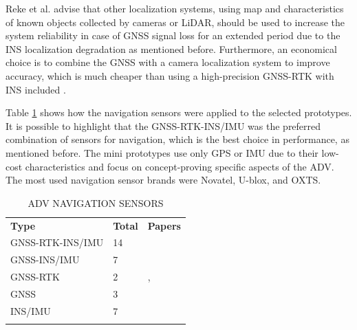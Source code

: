 \documentclass[lettersize,journal]{IEEEtran}
\begin{document}
Reke et al. \cite{Reke2020} advise that other localization systems, using map and characteristics of known objects collected by cameras or LiDAR, should be used to increase the system reliability in case of GNSS signal loss for an extended period due to the INS localization degradation as mentioned before. Furthermore, an economical choice is to combine the GNSS with a camera localization system to improve accuracy, which is much cheaper than using a high-precision GNSS-RTK with INS included \cite{Tas2016}. 

Table \ref{table:gnss} shows how the navigation sensors were applied to the selected prototypes. It is possible to highlight that the GNSS-RTK-INS/IMU was the preferred combination of sensors for navigation, which is the best choice in performance, as mentioned before. The mini prototypes use only GPS or IMU due to their low-cost characteristics and focus on concept-proving specific aspects of the ADV. The most used navigation sensor brands were Novatel, U-blox, and OXTS.




\begin{table}[!ht]
  \centering
  \captionsetup{
    format=hang,
    justification=raggedright,
    singlelinecheck=false,
    skip=9pt,
  }
  \caption{\MakeUppercase{ADV Navigation Sensors}}
  \label{table:gnss}
  \def\arraystretch{1.2} 
  \begin{tabularx}{\textwidth}{>{\raggedright\arraybackslash}p{2.5cm}>{\centering\arraybackslash}p{0.7cm}X}
    \arrayrulecolor{white}
    \rowcolor{white}
    \textbf{Type} & \textbf{Total} & \textbf{Papers} \\
    \arrayrulecolor{cor_tabela} \hline
    
    GNSS-RTK-INS/IMU & \cellcolor{cor_tabela}14 & \cellcolor{cor_tabela}
\cite{Jo2015,Broggi2015a,Belbachir2017,Zong2018,Tas2018a,Munir2018,Aramrattana2018,Belcarz2018,Xu2018,Kessler2019,Angel2020,aguilar2017,Broggi2015,ORJUELA202015161}
\\
    \arrayrulecolor{cor_tabela} \hline

    GNSS-INS/IMU & \cellcolor{cor_tabela}7 & \cellcolor{cor_tabela}
\cite{Gupta2015,Buechel2015,buchegger2018,Reke2020,el2020,Betz2019,Marin-Plaza2019} \\
    \arrayrulecolor{cor_tabela} \hline

    GNSS-RTK & \cellcolor{cor_tabela}2 & \cellcolor{cor_tabela}
\cite{Kunz2015}, \cite{Kato2015} \\
    \arrayrulecolor{cor_tabela} \hline

    GNSS & \cellcolor{cor_tabela}3 & \cellcolor{cor_tabela}
\cite{al2018,roestam2019,el2020} \\
    \arrayrulecolor{cor_tabela} \hline

    INS/IMU & \cellcolor{cor_tabela}7 & \cellcolor{cor_tabela}
\cite{Tang2018,Percinski2018,fayjie2018,Gotlib2019,Zhou2019,Fathy2020,ILIE2020530} \\
    \arrayrulecolor{cor_tabela} \hline

  \end{tabularx}
\end{table}
\end{document}
